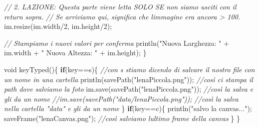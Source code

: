 \documentclass[
]{article}
\newenvironment{Shaded}{}{}
\newcommand{\CharTok}[1]{\textcolor[rgb]{0.25,0.44,0.63}{#1}}
\newcommand{\CommentTok}[1]{\textcolor[rgb]{0.38,0.63,0.69}{\textit{#1}}}
\newcommand{\ControlFlowTok}[1]{\textcolor[rgb]{0.00,0.44,0.13}{\textbf{#1}}}
\newcommand{\DataTypeTok}[1]{\textcolor[rgb]{0.56,0.13,0.00}{#1}}
\newcommand{\DecValTok}[1]{\textcolor[rgb]{0.25,0.63,0.44}{#1}}
\newcommand{\FunctionTok}[1]{\textcolor[rgb]{0.02,0.16,0.49}{#1}}
\newcommand{\NormalTok}[1]{#1}
\newcommand{\OperatorTok}[1]{\textcolor[rgb]{0.40,0.40,0.40}{#1}}
\newcommand{\StringTok}[1]{\textcolor[rgb]{0.25,0.44,0.63}{#1}}
\begin{document}
\begin{Shaded}
\begin{Highlighting}[]
  \CommentTok{// 2. L\textquotesingle{}AZIONE: Questa parte viene letta SOLO SE non siamo usciti con il return sopra.}
  \CommentTok{// Se arriviamo qui, significa che l\textquotesingle{}immagine era ancora \textgreater{} 100.}
\NormalTok{  im}\OperatorTok{.}\FunctionTok{resize}\OperatorTok{(}\NormalTok{im}\OperatorTok{.}\FunctionTok{width}\OperatorTok{/}\DecValTok{2}\OperatorTok{,}\NormalTok{ im}\OperatorTok{.}\FunctionTok{height}\OperatorTok{/}\DecValTok{2}\OperatorTok{);} 

  \CommentTok{// Stampiamo i nuovi valori per conferma}
  \FunctionTok{println}\OperatorTok{(}\StringTok{"Nuova Larghezza: "} \OperatorTok{+}\NormalTok{ im}\OperatorTok{.}\FunctionTok{width} \OperatorTok{+} \StringTok{" Nuova Altezza: "} \OperatorTok{+}\NormalTok{ im}\OperatorTok{.}\FunctionTok{height}\OperatorTok{);}
\OperatorTok{\}}

\DataTypeTok{void} \FunctionTok{keyTyped}\OperatorTok{()\{}
  \ControlFlowTok{if}\OperatorTok{(}\NormalTok{key}\OperatorTok{==}\CharTok{\textquotesingle{}s\textquotesingle{}}\OperatorTok{)\{} \CommentTok{//con s stiamo dicendo di salvare il nostro file con un nome in una cartella}
    \FunctionTok{println}\OperatorTok{(}\FunctionTok{savePath}\OperatorTok{(}\StringTok{"lenaPiccola.png"}\OperatorTok{));} \CommentTok{//così ci stampa il path dove salviamo la foto}
\NormalTok{    im}\OperatorTok{.}\FunctionTok{save}\OperatorTok{(}\FunctionTok{savePath}\OperatorTok{(}\StringTok{"lenaPiccola.png"}\OperatorTok{));} \CommentTok{//così la salva e gli da un nome}
    \CommentTok{//im.save(savePath("data/lenaPiccola.png")); //così la salva nella cartella "data" e gli da un nome}
  \OperatorTok{\}}
  \ControlFlowTok{if}\OperatorTok{(}\NormalTok{key}\OperatorTok{==}\CharTok{\textquotesingle{}c\textquotesingle{}}\OperatorTok{)\{}
  \FunctionTok{println}\OperatorTok{(}\StringTok{"salvo la canvas..."}\OperatorTok{);}
  \FunctionTok{saveFrame}\OperatorTok{(}\StringTok{"lenaCanvas.png"}\OperatorTok{);} \CommentTok{//così salviamo l\textquotesingle{}ultimo frame della canvas}
  \OperatorTok{\}}
\OperatorTok{\}}
\end{Highlighting}
\end{Shaded}
\end{document}
